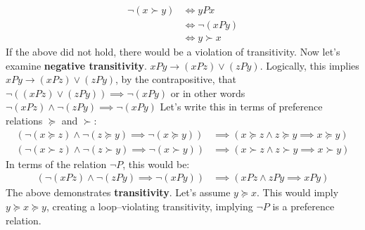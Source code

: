 \documentclass{article}
\begin{document}
\begin{align}
    \neg(x \succ y) & \Longleftrightarrow yPx\\ &\Longleftrightarrow \neg(x P y) \\ &\Longleftrightarrow y \succ x 
\end{align}
If the above did not hold, there would be a violation of transitivity. 
Now let's examine \textbf{negative transitivity}. $xPy\rightarrow (xPz) \lor (zPy)$. Logically, this implies $xPy\rightarrow (xPz) \lor (zPy)$, by the contrapositive, that $\neg((xPz) \lor (zPy))\implies \neg(xPy)$ or in other words $\neg(xPz) \land \neg(zPy)\implies \neg(xPy)$ Let's write this in terms of preference relations $\succeq$ and $\succ$: 
\begin{align}
     (\neg(x\succeq z) \land \neg(z\succeq y) \implies \neg(x\succeq y)) &\implies (x\succeq z \land z\succeq y \implies x\succeq y)\\  (\neg(x\succ z) \land \neg(z\succ y) \implies \neg(x\succ y)) &\implies (x\succ z \land z\succ y \implies x\succ y)
\end{align}
In terms of the relation $\neg P$, this would be:
\begin{align}
     (\neg(xP z) \land \neg(zP y) \implies \neg(x P  y)) &\implies (x P  z \land z P y \implies x P y)
\end{align}
The above demonstrates \textbf{transitivity}. Let's assume $y\succeq x$. This would imply $y\succeq x \succeq y$, creating a loop--violating transitivity, implying $\neg P$ is a preference relation. 
\newpage
\end{document}
